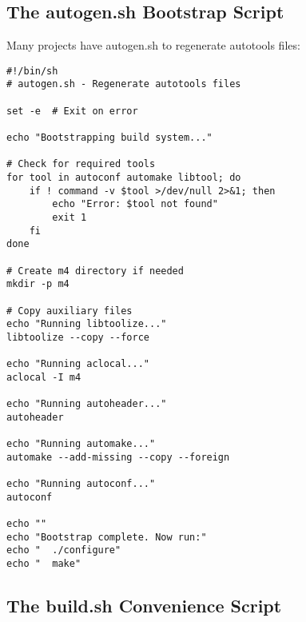 \subsection{The autogen.sh Bootstrap Script}

Many projects have autogen.sh to regenerate autotools files:

\begin{lstlisting}
#!/bin/sh
# autogen.sh - Regenerate autotools files

set -e  # Exit on error

echo "Bootstrapping build system..."

# Check for required tools
for tool in autoconf automake libtool; do
    if ! command -v $tool >/dev/null 2>&1; then
        echo "Error: $tool not found"
        exit 1
    fi
done

# Create m4 directory if needed
mkdir -p m4

# Copy auxiliary files
echo "Running libtoolize..."
libtoolize --copy --force

echo "Running aclocal..."
aclocal -I m4

echo "Running autoheader..."
autoheader

echo "Running automake..."
automake --add-missing --copy --foreign

echo "Running autoconf..."
autoconf

echo ""
echo "Bootstrap complete. Now run:"
echo "  ./configure"
echo "  make"
\end{lstlisting}

\subsection{The build.sh Convenience Script}

